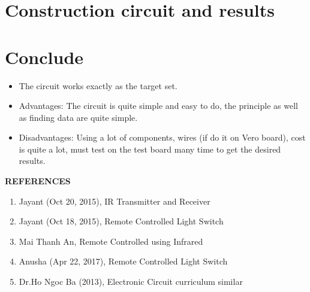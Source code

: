 \documentclass[a4paper]{report}
\begin{document}
    \chapter{Construction circuit and results}
    \thispagestyle{fancy}
    \fancyhf{}

    \chapter{Conclude}
    \thispagestyle{fancy}
    \fancyhf{}
    \begin{itemize}
        \item The circuit works exactly as the target set.
        \item Advantages: The circuit is quite simple and easy to do, the principle as well as finding data are quite simple.
        \item Disadvantages: Using a lot of components, wires (if do it on Vero board), cost is quite a lot, must test on the test board many time to get the desired results.
    \end{itemize}

    \newpage
    \thispagestyle{plain}
    \centerline{\textbf{\huge{REFERENCES}}}
    \vspace{10mm}
    \begin{enumerate}
        \item Jayant (Oct 20, 2015), IR Transmitter and Receiver
        \item Jayant (Oct 18, 2015), Remote Controlled Light Switch
        \item Mai Thanh An, Remote Controlled using Infrared 
        \item Anusha (Apr 22, 2017), Remote Controlled Light Switch
        \item Dr.Ho Ngoc Ba (2013), Electronic Circuit curriculum similar
    \end{enumerate}
\end{document}
